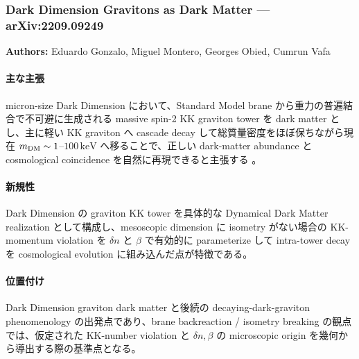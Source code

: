 \subsubsection{Dark Dimension Gravitons as Dark Matter --- arXiv:2209.09249}

\textbf{Authors:} Eduardo Gonzalo, Miguel Montero, Georges Obied, Cumrun Vafa

\paragraph{主な主張}
micron-size Dark Dimension において、Standard Model brane から重力の普遍結合で不可避に生成される massive spin-2 KK graviton tower を dark matter とし、主に軽い KK graviton へ cascade decay して総質量密度をほぼ保ちながら現在 $m_{\rm DM}\sim 1$--$100\,\mathrm{keV}$ へ移ることで、正しい dark-matter abundance と cosmological coincidence を自然に再現できると主張する \cite{Gonzalo:2022DarkGravitons}。

\paragraph{新規性}
Dark Dimension の graviton KK tower を具体的な Dynamical Dark Matter realization として構成し、mesoscopic dimension に isometry がない場合の KK-momentum violation を $\delta n$ と $\beta$ で有効的に parameterize して intra-tower decay を cosmological evolution に組み込んだ点が特徴である。

\paragraph{位置付け}
Dark Dimension graviton dark matter と後続の decaying-dark-graviton phenomenology の出発点であり、brane backreaction / isometry breaking の観点では、仮定された KK-number violation と $\delta n,\beta$ の microscopic origin を幾何から導出する際の基準点となる。
